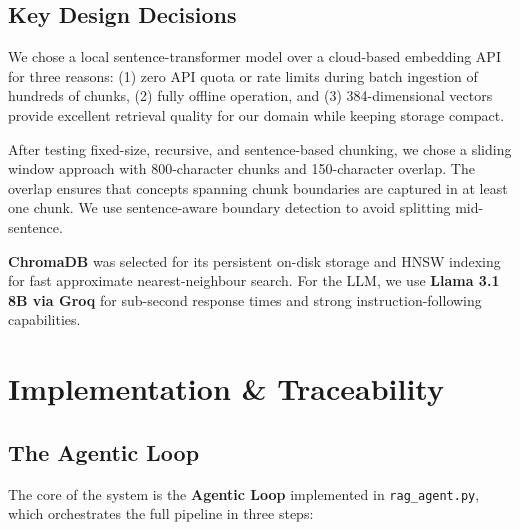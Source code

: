 \documentclass[11pt, a4paper]{article}
\begin{document}
\subsection{Key Design Decisions}

\begin{tcolorbox}[colback=blue!5,colframe=blue!40!black,title=Embedding Model: all-MiniLM-L6-v2 (Local)]
We chose a local sentence-transformer model over a cloud-based embedding API for three reasons: (1) zero API quota or rate limits during batch ingestion of hundreds of chunks, (2) fully offline operation, and (3) 384-dimensional vectors provide excellent retrieval quality for our domain while keeping storage compact.
\end{tcolorbox}

\begin{tcolorbox}[colback=green!5,colframe=green!40!black,title=Chunking Strategy: Sliding Window (800/150)]
After testing fixed-size, recursive, and sentence-based chunking, we chose a sliding window approach with 800-character chunks and 150-character overlap. The overlap ensures that concepts spanning chunk boundaries are captured in at least one chunk. We use sentence-aware boundary detection to avoid splitting mid-sentence.
\end{tcolorbox}

\begin{tcolorbox}[colback=yellow!5,colframe=yellow!40!black,title=Vector Store \& LLM Selection]
\textbf{ChromaDB} was selected for its persistent on-disk storage and HNSW indexing for fast approximate nearest-neighbour search. For the LLM, we use \textbf{Llama 3.1 8B via Groq} for sub-second response times and strong instruction-following capabilities.
\end{tcolorbox}

\section{Implementation \& Traceability}

\subsection{The Agentic Loop}
The core of the system is the \textbf{Agentic Loop} implemented in \texttt{rag\_agent.py}, which orchestrates the full pipeline in three steps:
\end{document}
